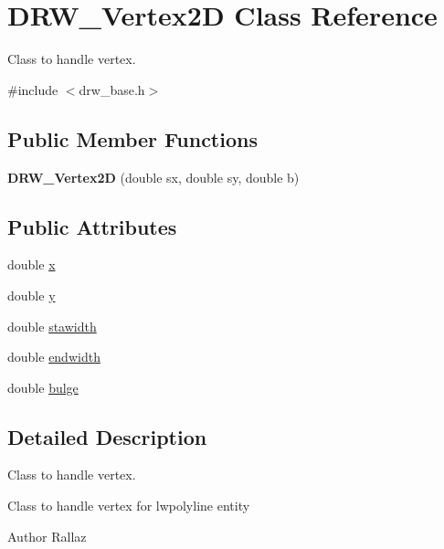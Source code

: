 \hypertarget{classDRW__Vertex2D}{\section{D\-R\-W\-\_\-\-Vertex2\-D Class Reference}
\label{classDRW__Vertex2D}
}


Class to handle vertex.  




{\ttfamily \#include $<$drw\-\_\-base.\-h$>$}

\subsection*{Public Member Functions}
\begin{DoxyCompactItemize}
\item 
\hypertarget{classDRW__Vertex2D_a1348e7044a543e2312e71d4b371d8e97}{{\bfseries D\-R\-W\-\_\-\-Vertex2\-D} (double sx, double sy, double b)}\label{classDRW__Vertex2D_a1348e7044a543e2312e71d4b371d8e97}

\end{DoxyCompactItemize}
\subsection*{Public Attributes}
\begin{DoxyCompactItemize}
\item 
double \hyperlink{classDRW__Vertex2D_abe6dee44053f5d82387209e7c76186c8}{x}
\item 
double \hyperlink{classDRW__Vertex2D_a45e73443961543c05bff340dfe14cb8e}{y}
\item 
double \hyperlink{classDRW__Vertex2D_a5d3c878a768fa6c10f158a2bbd9726ca}{stawidth}
\item 
double \hyperlink{classDRW__Vertex2D_a810d285d1f81da75a895ade902e8d159}{endwidth}
\item 
double \hyperlink{classDRW__Vertex2D_a844591ce6d6f01562b831afe4261e99f}{bulge}
\end{DoxyCompactItemize}


\subsection{Detailed Description}
Class to handle vertex. 

Class to handle vertex for lwpolyline entity \begin{DoxyAuthor}{Author}
Rallaz 
\end{DoxyAuthor}


